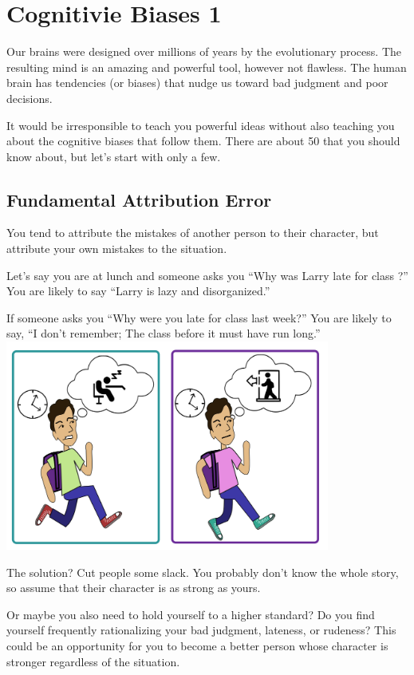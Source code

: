 \chapter{Cognitivie Biases 1}


Our brains were designed over millions of years by the evolutionary
process. The resulting mind is an amazing and powerful tool, however
not flawless. The human brain has tendencies (or biases) that nudge us
toward bad judgment and poor decisions.

It would be irresponsible to teach you powerful ideas without
also teaching you about the cognitive biases that follow them. There are about 50
that you should know about, but let's start with only a few.

\section{Fundamental Attribution Error}

You tend to attribute
the mistakes of another person to their character, but attribute your
own mistakes to the situation.

Let's say you are at lunch and someone asks you ``Why was Larry late
for class ?''  You are likely to say ``Larry is lazy
and disorganized.''

If someone asks you ``Why were you late for class last week?''  You
are likely to say, ``I don't remember; The class before it must have
run long.''
\includegraphics[width=0.8\textwidth]{bias_late.png}

The solution? Cut people some slack. You probably don't know the whole
story, so assume that their character is as strong as yours.

Or maybe you also need to hold yourself to a higher standard? Do you find
yourself frequently rationalizing your bad judgment, lateness, or
rudeness?  This could be an opportunity for you to become a better
person whose character is stronger regardless of the situation.

